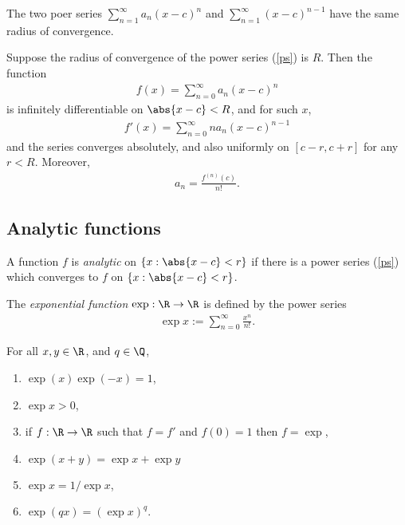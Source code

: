 \documentclass{article}
\begin{document}
\begin{lemma}[Notes 3.1]
	The two poer series $\sum_{n=1}^\infty a_n(x-c)^n$ and $\sum_{n=1}^\infty (x-c)^{n-1}$
	have the same radius of convergence.
\end{lemma}

\begin{theorem}[Notes 3.3]
	Suppose the radius of convergence of the power series (\ref{ps}) is $R$. Then
	the function
	\begin{align*}
		f(x) = \sum_{n=0}^\infty a_n(x-c)^n
	\end{align*}
	is infinitely differentiable on $\abs{x-c} < R$, and for such $x$,
	\begin{align*}
		f'(x) = \sum_{n=0}^\infty na_n(x-c)^{n-1}
	\end{align*}
	and the series converges absolutely, and also uniformly on $[c-r, c+r]$ for any
	$r<R$. Moreover,
	\begin{align*}
		a_n = \frac{f^{(n)}(c)}{n!}.
	\end{align*}
\end{theorem}

\subsection{Analytic functions}

\begin{definition}
	A function $f$ is \emph{analytic} on $\{x: \abs{x-c}<r\}$ if there is a power
	series (\ref{ps}) which converges to $f$ on $\{x: \abs{x-c}<r\}$.
\end{definition}

\begin{definition}
	The \emph{exponential function} $\exp : \R\to\R$ is defined by the power series
	\begin{align*}
		\exp x := \sum_{n=0}^\infty \frac{x^n}{n!}.
	\end{align*}
\end{definition}

\begin{theorem}
	For all $x,y\in\R$, and $q\in\Q$,
	\begin{enumerate}
		\item $\exp(x)\exp(-x)=1$,
		\item $\exp x > 0$,
		\item if $f:\R\to\R$ such that $f=f'$ and $f(0)=1$ then $f=\exp$,
		\item $\exp(x+y)=\exp x + \exp y$
		\item $\exp x = 1/\exp x$,
		\item $\exp (qx) = (\exp x)^q$.
	\end{enumerate}
\end{theorem}
\end{document}
